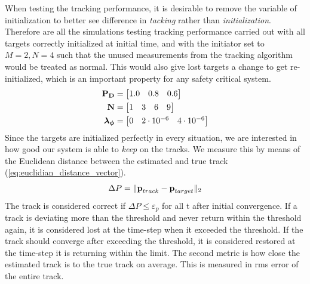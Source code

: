 When testing the tracking performance, it is desirable to remove the variable of initialization to better see difference in \emph{tacking} rather than \emph{initialization}. Therefore are all the simulations testing tracking performance carried out with all targets correctly initialized at initial time, and with the initiator set to \(M=2, N=4\) such that the unused measurements from the tracking algorithm would be treated as normal. This would also give lost targets a change to get re-initialized, which is an important property for any safety critical system.
\begin{equation}\label{eq:tracking_test_table}
\begin{split}
\boldsymbol{\mathbf{P_D}} &= \begin{bmatrix} 1.0 & 0.8 & 0.6 \end{bmatrix} \\
\boldsymbol{\mathbf{N}} &= \begin{bmatrix} 1 & 3 & 6 & 9 \end{bmatrix} \\
\boldsymbol{\mathbf{\lambda_\phi}} &= \begin{bmatrix} 0 & 2\cdot10^{-6} & 4\cdot10^{-6} \end{bmatrix}
\end{split}
\end{equation}
Since the targets are initialized perfectly in every situation, we are interested in how good our system is able to \emph{keep} on the tracks. We measure this by means of the Euclidean distance between the estimated and true track (\ref{eq:euclidian_distance_vector}).
\begin{equation}
	\Delta P = \| \boldsymbol{\mathbf{p}}_{track}-\boldsymbol{\mathbf{p}}_{target} \|_2
\label{eq:euclidian_distance_vector}
\end{equation}
The track is considered correct if \(\Delta P \leq \varepsilon_p\) for all t after initial convergence. If a track is deviating more than the threshold and never return within the threshold again, it is considered lost at the time-step when it exceeded the threshold. If the track should converge after exceeding the threshold, it is considered restored at the time-step it is returning within the limit. The second metric is how close the estimated track is to the true track on average. This is measured in \gls{rms} error of the entire track.

